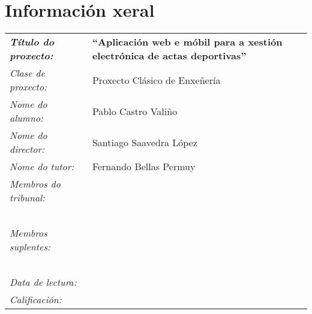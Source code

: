 \thispagestyle{empty}
\section*{Información xeral}
\vfill
\begin{center}
\begin{tabular}{p{4.5cm}p{9cm}}
\textbf{\emph{Título do proxecto:}} & \textbf{``Aplicación web e móbil para a xestión 
electrónica de actas deportivas''} \\[0.5cm]
\emph{Clase de proxecto:} & Proxecto Clásico de Enxeñería \\[0.5cm]
\emph{Nome do alumno:} & Pablo Castro Valiño \\[0.5cm]
\emph{Nome do director:} & Santiago Saavedra López \\[0.5cm]
\emph{Nome do tutor:} & Fernando Bellas Permuy \\[0.5cm]
\emph{Membros do tribunal:} & \\[0.5cm]
& \\
& \\
& \\
& \\
& \\
\emph{Membros suplentes:} & \\[0.5cm]
& \\
& \\
& \\
& \\
& \\
\emph{Data de lectura:} & \\[0.5cm]
\emph{Calificación:} & \\
\end{tabular}
\end{center}
\vfill
